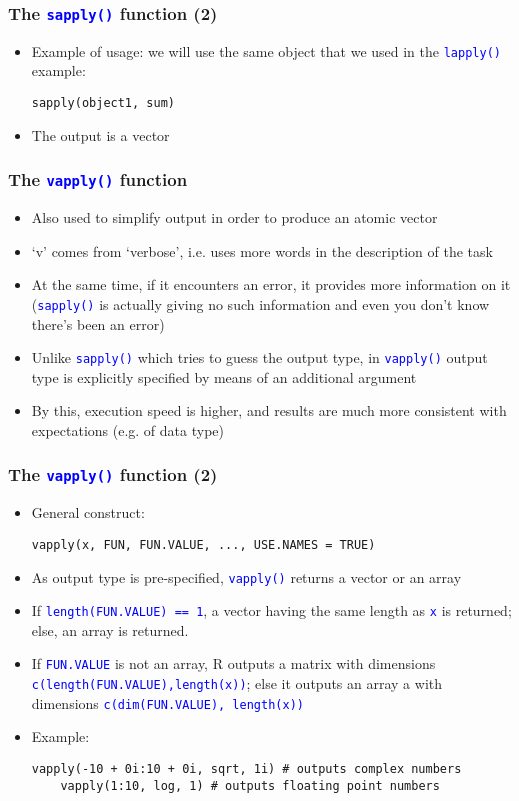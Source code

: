 \documentclass[10pt]{beamer}
\newcommand{\cc}[1]{\texttt{\textcolor{blue}{#1}}}
\theoremstyle{definition}
\begin{document}
\begin{frame}[fragile]
\frametitle{The \cc{sapply()} function (2)}
\begin{itemize}
	\item Example of usage: we will use the same object that we used in the \cc{lapply()} example:
	\begin{lstlisting}[style = rstyle, breaklines]
	sapply(object1, sum)
	\end{lstlisting}
	\item The output is a vector
\end{itemize}
\end{frame}

\begin{frame}[fragile]
\frametitle{The \cc{vapply()} function}
\begin{itemize}
	\item Also used to simplify output in order to produce an atomic vector
	\item `v' comes from `verbose', i.e. uses more words in the description of the task
	\item At the same time, if it encounters an error, it provides more information on it (\cc{sapply()} is actually giving no such information and even you don't know there's been an error)
	\item Unlike \cc{sapply()} which tries to guess the output type, in \cc{vapply()} output type is explicitly specified by means of an additional argument
	\item By this, execution speed is higher, and results are much more consistent with expectations (e.g. of data type)
\end{itemize}
\end{frame}

\begin{frame}[fragile]
\frametitle{The \cc{vapply()} function (2)}
\begin{itemize}
	\item General construct:
	\begin{lstlisting}[style = rstyle, breaklines]
	vapply(x, FUN, FUN.VALUE, ..., USE.NAMES = TRUE)
	\end{lstlisting}
	\item As output type is pre-specified, \cc{vapply()} returns a vector or an array
	\item If \cc{length(FUN.VALUE) == 1}, a vector having the same length as \cc{x} is returned; else, an array is returned.
	\item If \cc{FUN.VALUE} is not an array, R outputs a matrix with dimensions \cc{c(length(FUN.VALUE),length(x))}; else it outputs an array a with dimensions \cc{c(dim(FUN.VALUE), length(x))}
	\item Example:
	\begin{lstlisting}[style = rstyle, breaklines]
	vapply(-10 + 0i:10 + 0i, sqrt, 1i) # outputs complex numbers
	vapply(1:10, log, 1) # outputs floating point numbers
	\end{lstlisting}
\end{itemize}
\end{frame}
\end{document}
